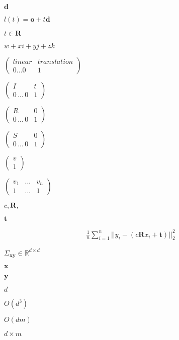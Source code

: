 \documentclass{article}
\begin{document}
$ \mathbf{d} $
\pagebreak

$ l(t) = \mathbf{o} + t \mathbf{d} $
\pagebreak

$ t \in \mathbf{R} $
\pagebreak

$ w+xi+yj+zk $
\pagebreak

$ \left( \begin{array}{cc} linear & translation\\ 0 ... 0 & 1 \end{array} \right) $
\pagebreak

$ \left( \begin{array}{cc} I & t \\ 0\,...\,0 & 1 \end{array} \right) $
\pagebreak

$ \left( \begin{array}{cc} R & 0\\ 0\,...\,0 & 1 \end{array} \right) $
\pagebreak

$ \left( \begin{array}{cc} S & 0\\ 0\,...\,0 & 1 \end{array} \right) $
\pagebreak

$ \left( \begin{array}{c} v\\ 1 \end{array} \right) $
\pagebreak

$ \left( \begin{array}{ccc} v_1 & ... & v_n\\ 1 & ... & 1 \end{array} \right) $
\pagebreak

$ c, \mathbf{R}, $
\pagebreak

$ \mathbf{t} $
\pagebreak

\begin{align*} \frac{1}{n} \sum_{i=1}^n \vert\vert y_i - (c\mathbf{R}x_i + \mathbf{t}) \vert\vert_2^2 \end{align*}
\pagebreak

$ \Sigma_{\mathbf{x}\mathbf{y}} \in \mathbb{R}^{d \times d} $
\pagebreak

$ \mathbf{x} $
\pagebreak

$ \mathbf{y} $
\pagebreak

$d$
\pagebreak

$O(d^3)$
\pagebreak

$O(dm)$
\pagebreak

$d \times m$
\pagebreak
\end{document}
